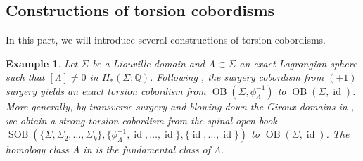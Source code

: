 \documentclass[11pt]{amsart}
\numberwithin{equation}{section}
\newtheorem{example}[theorem]{\textbf{Example}}
\def\Q{{\mathbb Q}}
\DeclareMathOperator{\Id}{id}
\DeclareMathOperator{\OB}{OB}
\DeclareMathOperator{\SOB}{SOB}
\begin{document}
\subsection{Constructions of torsion cobordisms}\label{ss:construct_torsion}
In this part, we will introduce several constructions of torsion cobordisms. 
\begin{example}\label{ex:SOB}
 Let $\Sigma$ be a Liouville domain and $\Lambda\subset \Sigma$ an exact Lagrangian sphere such that $[\Lambda]\ne 0$ in $H_*(\Sigma;\Q)$. Following , the surgery cobordism from $(+1)$ surgery yields an exact torsion cobordism from $\OB(\Sigma,\phi^{-1}_{\Lambda})$ to $\OB(\Sigma,\Id)$. More generally, by transverse surgery and blowing down the Giroux domains in , we obtain a strong torsion cobordism from the spinal open book $\SOB\left(\{\Sigma,\Sigma_2,\ldots,\Sigma_k\},\{\phi^{-1}_{\Lambda},\Id,\ldots,\Id\},\{\Id, \ldots, \Id\}\right)$ to $\OB(\Sigma,\Id)$. The homology class $A$ in  is the fundamental class of $\Lambda$. 
\end{example}
\end{document}
